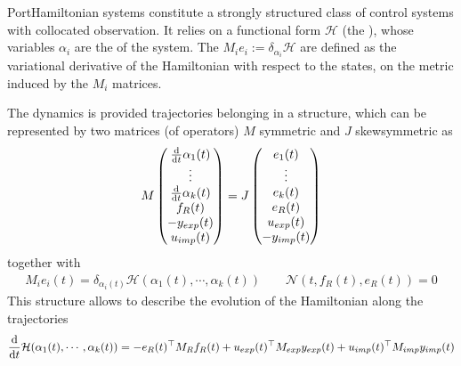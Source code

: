 \documentclass[letterpaper,10pt,english]{sphinxmanual}
\begin{document}
\sphinxAtStartPar
Port\sphinxhyphen{}Hamiltonian systems constitute a strongly structured class of control systems with collocated observation. It relies on a functional form \(\mathcal{H}\) (the ), whose variables \(\alpha_i\) are the  of the system. The  \(M_i e_i := \delta_{\alpha_i} \mathcal{H}\) are defined as the variational derivative of the Hamiltonian with respect to the states, on the metric induced by the \(M_i\) matrices.

\sphinxAtStartPar
The dynamics is provided  trajectories belonging in a  structure, which can be represented by two matrices (of operators) \(M\) symmetric and \(J\) skew\sphinxhyphen{}symmetric as
\begin{equation*}
\begin{split}M
\begin{pmatrix} \frac{\rm d}{{\rm d}t} \alpha_1(t) \\ \vdots \\ \frac{\rm d}{{\rm d}t} \alpha_k(t) \\ f_R(t) \\ - y_{exp}(t) \\ u_{imp}(t) \end{pmatrix}
= J
\begin{pmatrix} e_1(t) \\ \vdots \\ e_k(t) \\ e_R(t) \\ u_{exp}(t) \\ - y_{imp}(t) \end{pmatrix}\end{split}
\end{equation*}
\sphinxAtStartPar
together with 
\begin{equation*}
\begin{split}M_i e_i(t) = \delta_{\alpha_i(t)} \mathcal{H}(\alpha_1(t), \cdots, \alpha_k(t))
\qquad
\mathcal{N}(t, f_R(t), e_R(t)) = 0\end{split}
\end{equation*}
\sphinxAtStartPar
This structure allows to describe the evolution of the Hamiltonian along the trajectories
\begin{equation*}
\begin{split}\frac{\rm d}{{\rm d}t} \mathcal{H}(\alpha_1(t), \cdots, \alpha_k(t)) = - e_R(t)^\top M_R f_R(t) + u_{exp}(t)^\top M_{exp} y_{exp}(t) + u_{imp}(t)^\top M_{imp} y_{imp}(t)\end{split}
\end{equation*}
\end{document}

